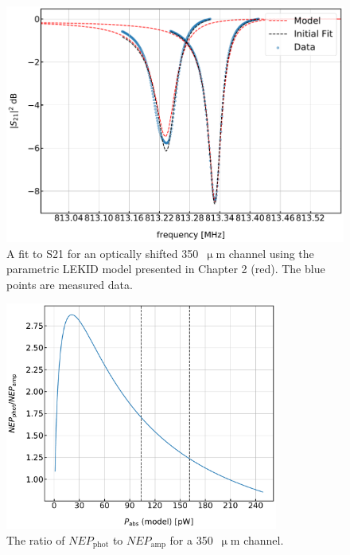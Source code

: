 \begin{figure}[!htbp]
\centering
\includegraphics[width=\textwidth]{figures/blast_data/sweeps/350_S21model_ice_final}
\caption[~A parametric fit of  for an optically shifted 350~ channel.]{A fit to \gls{S21} for an optically shifted 350~$\upmu$m channel using the parametric LEKID model presented in Chapter 2 (red). The blue points are measured data.}
\label{fig:350 S21 model}
\end{figure}

\begin{figure}[!htbp]
\centering
\includegraphics[width=0.8\textwidth]{figures/blast_data/sweeps/350_NEPphotNEPamp}
\caption[~Model ratio of  to  for a  350~ channel.]{The ratio of $NEP_{\mathrm{phot}}$ to $NEP_{\mathrm{amp}}$ for a 350~$\upmu$m channel.}
\label{fig:nep ratio}
\end{figure}

